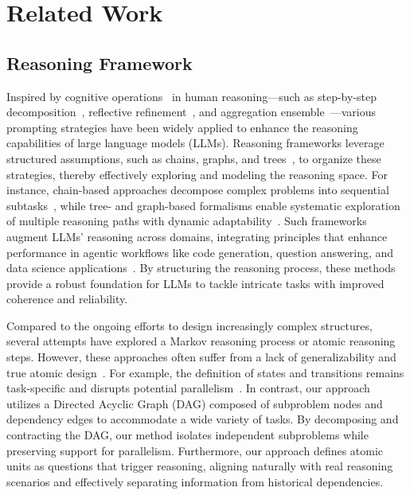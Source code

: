 \section{Related Work}

\subsection{Reasoning Framework}

Inspired by cognitive operations~\cite{Smelser2001Cognitive} in human reasoning—such as step-by-step decomposition~\cite{Wei2022cot, zhou2023least, wang2023planandsolve, hao2024llm}, reflective refinement~\cite{Madaan2023selfrefine, zheng2024stepback, zheng2023progressive}, and aggregation ensemble~\cite{Wang2023cotsc, jiang2023llmblender, yao2025determine}—various prompting strategies have been widely applied to enhance the reasoning capabilities of large language models (LLMs). Reasoning frameworks leverage structured assumptions, such as chains, graphs, and trees~\cite{Yao2023tot, Besta2024got, zhang2024tse}, to organize these strategies, thereby effectively exploring and modeling the reasoning space. For instance, chain-based approaches decompose complex problems into sequential subtasks~\cite{Wei2022cot, zhou2023least, wang2023planandsolve}, while tree- and graph-based formalisms enable systematic exploration of multiple reasoning paths with dynamic adaptability~\cite{Yao2023tot, Besta2024got}. Such frameworks augment LLMs’ reasoning across domains, integrating principles that enhance performance in agentic workflows like code generation, question answering, and data science applications~\cite{Hong2024metagpt, Hong2024data, zhang2025evoflow, zhang2024mobileexperts}. By structuring the reasoning process, these methods provide a robust foundation for LLMs to tackle intricate tasks with improved coherence and reliability.

Compared to the ongoing efforts to design increasingly complex structures, several attempts have explored a Markov reasoning process or atomic reasoning steps. However, these approaches often suffer from a lack of generalizability and true atomic design~\cite{Xin2024atomr, Xiang2024AtomThink, Zhou2024selfdiscover, xiang2025can}. For example, the definition of states and transitions remains task-specific and disrupts potential parallelism~\cite{hao2023rap, Yang2024mcot, Zekri2024Large}. In contrast, our approach utilizes a Directed Acyclic Graph (DAG) composed of subproblem nodes and dependency edges to accommodate a wide variety of tasks. By decomposing and contracting the DAG, our method isolates independent subproblems while preserving support for parallelism. Furthermore, our approach defines atomic units as questions that trigger reasoning, aligning naturally with real reasoning scenarios and effectively separating information from historical dependencies.

